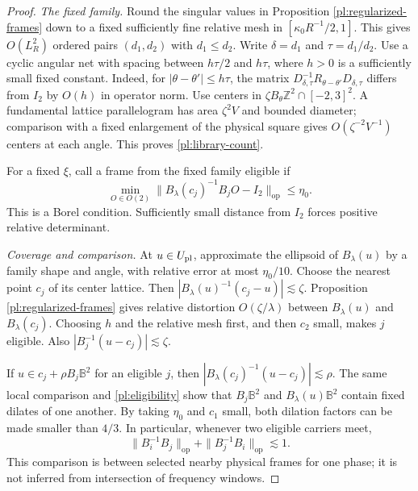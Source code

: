 \documentclass[11pt]{amsart}
\theoremstyle{definition}
\theoremstyle{remark}
\numberwithin{equation}{section}
\begin{document}
\begin{proof}
\emph{The fixed family.} Round the singular values in Proposition \ref{pl:regularized-frames} down to a fixed sufficiently fine relative mesh in $[\kappa_0R^{-1}/2,1]$. This gives $O(L_R^2)$ ordered pairs $(d_1,d_2)$ with $d_1\le d_2$. Write $\delta=d_1$ and $\tau=d_1/d_2$. Use a cyclic angular net with spacing between $h\tau/2$ and $h\tau$, where $h>0$ is a sufficiently small fixed constant. Indeed, for $|\theta-\theta'|\le h\tau$, the matrix $D_{\delta,\tau}^{-1}R_{\theta-\theta'}D_{\delta,\tau}$ differs from $I_2$ by $O(h)$ in operator norm. Use centers in $\zeta B_\theta\mathbb Z^2\cap[-2,3]^2$. A fundamental lattice parallelogram has area $\zeta^2V$ and bounded diameter; comparison with a fixed enlargement of the physical square gives $O(\zeta^{-2}V^{-1})$ centers at each angle. This proves \eqref{pl:library-count}.

For a fixed $\xi$, call a frame from the fixed family eligible if
\begin{equation}\label{pl:eligibility}
\min_{O\in O(2)}\|B_\lambda(c_j)^{-1}B_jO-I_2\|_{\mathrm{op}}\le\eta_0.
\end{equation}
This is a Borel condition. Sufficiently small distance from $I_2$ forces positive relative determinant.

\emph{Coverage and comparison.} At $u\in U_{\rm pl}$, approximate the ellipsoid of $B_\lambda(u)$ by a family shape and angle, with relative error at most $\eta_0/10$. Choose the nearest point $c_j$ of its center lattice. Then $|B_\lambda(u)^{-1}(c_j-u)|\lesssim\zeta$. Proposition \ref{pl:regularized-frames} gives relative distortion $O(\zeta/\lambda)$ between $B_\lambda(u)$ and $B_\lambda(c_j)$. Choosing $h$ and the relative mesh first, and then $c_2$ small, makes $j$ eligible. Also $|B_j^{-1}(u-c_j)|\lesssim\zeta$.

If $u\in c_j+\rho B_j\mathbb B^2$ for an eligible $j$, then $|B_\lambda(c_j)^{-1}(u-c_j)|\lesssim\rho$. The same local comparison and \eqref{pl:eligibility} show that $B_j\mathbb B^2$ and $B_\lambda(u)\mathbb B^2$ contain fixed dilates of one another. By taking $\eta_0$ and $c_1$ small, both dilation factors can be made smaller than $4/3$. In particular, whenever two eligible carriers meet,
\begin{equation}\label{pl:intersecting-carrier-comparison}
\|B_i^{-1}B_j\|_{\mathrm{op}}+\|B_j^{-1}B_i\|_{\mathrm{op}}\lesssim 1.
\end{equation}
This comparison is between selected nearby physical frames for one phase; it is not inferred from intersection of frequency windows.


\end{proof}
\end{document}
